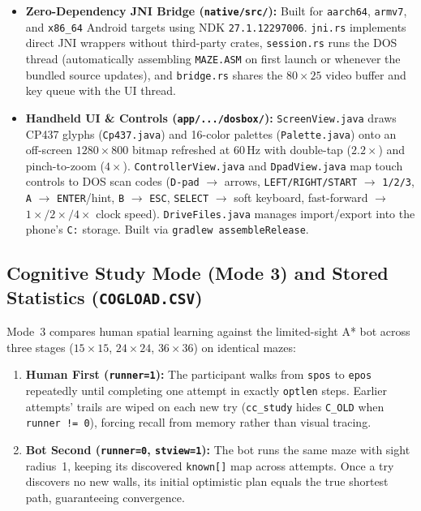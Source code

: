 \documentclass[11pt,a4paper]{article}
\begin{document}
\begin{itemize}
    \item \textbf{Zero-Dependency JNI Bridge (\texttt{native/src/}):} Built for \texttt{aarch64}, \texttt{armv7}, and \texttt{x86\_64} Android targets using NDK \texttt{27.1.12297006}. \texttt{jni.rs} implements direct JNI wrappers without third-party crates, \texttt{session.rs} runs the DOS thread (automatically assembling \texttt{MAZE.ASM} on first launch or whenever the bundled source updates), and \texttt{bridge.rs} shares the $80\times 25$ video buffer and key queue with the UI thread.
    \item \textbf{Handheld UI \& Controls (\texttt{app/.../dosbox/}):} \texttt{ScreenView.java} draws CP437 glyphs (\texttt{Cp437.java}) and 16-color palettes (\texttt{Palette.java}) onto an off-screen $1280\times 800$ bitmap refreshed at 60\,Hz with double-tap ($2.2\times$) and pinch-to-zoom ($4\times$). \texttt{ControllerView.java} and \texttt{DpadView.java} map touch controls to DOS scan codes (\texttt{D-pad} $\to$ arrows, \texttt{LEFT/RIGHT/START} $\to$ \texttt{1/2/3}, \texttt{A} $\to$ \texttt{ENTER}/hint, \texttt{B} $\to$ \texttt{ESC}, \texttt{SELECT} $\to$ soft keyboard, fast-forward $\to$ $1\times / 2\times / 4\times$ clock speed). \texttt{DriveFiles.java} manages import/export into the phone's \texttt{C:} storage. Built via \texttt{gradlew assembleRelease}.
\end{itemize}

\subsection{Cognitive Study Mode (Mode 3) and Stored Statistics (\texttt{COGLOAD.CSV})}
Mode~3 compares human spatial learning against the limited-sight A* bot across three stages ($15\times 15$, $24\times 24$, $36\times 36$) on identical mazes:
\begin{enumerate}
    \item \textbf{Human First (\texttt{runner=1}):} The participant walks from \texttt{spos} to \texttt{epos} repeatedly until completing one attempt in exactly \texttt{optlen} steps. Earlier attempts' trails are wiped on each new try (\texttt{cc\_study} hides \texttt{C\_OLD} when \texttt{runner != 0}), forcing recall from memory rather than visual tracing.
    \item \textbf{Bot Second (\texttt{runner=0}, \texttt{stview=1}):} The bot runs the same maze with sight radius~1, keeping its discovered \texttt{known[]} map across attempts. Once a try discovers no new walls, its initial optimistic plan equals the true shortest path, guaranteeing convergence.
\end{enumerate}
\end{document}
